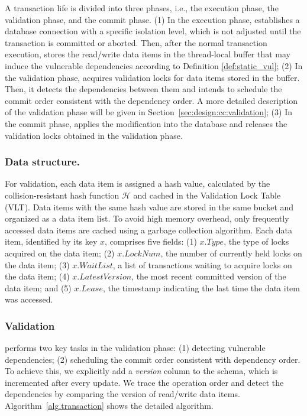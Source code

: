 A transaction life is divided into three phases, i.e., the execution phase, the validation phase, and the commit phase.
(1) In the execution phase, \sysname establishes a database connection with a specific isolation level, which is not adjusted until the transaction is committed or aborted. Then, after the normal transaction execution, \sysname stores the read/write data items in the thread-local buffer that may induce the vulnerable dependencies according to Definition \ref{def:static_vul};
(2) In the validation phase, \sysname acquires validation locks for data items stored in the buffer. Then, it detects the dependencies between them and intends to schedule the commit order consistent with the dependency order.
A more detailed description of the validation phase will be given in Section~\ref{sec:design:cc:validation}; 
(3) In the commit phase, \sysname applies the modification into the database and releases the validation locks obtained in the validation phase. 

{
\color{blue}
\subsubsection{Data structure.} 
For validation, each data item is assigned a hash value, calculated by the collision-resistant hash function $\mathcal{H}$ and cached in the Validation Lock Table (VLT). 
Data items with the same hash value are stored in the same bucket and organized as a data item list. 
To avoid high memory overhead, only frequently accessed data items are cached using a garbage collection algorithm. Each data item, identified by its key $x$, comprises five fields: (1) $x.Type$, the type of locks acquired on the data item; (2) $x.LockNum$, the number of currently held locks on the data item; (3) $x.WaitList$, a list of transactions waiting to acquire locks on the data item; (4) $x.LatestVersion$, the most recent committed version of the data item; and (5) $x.Lease$, the timestamp indicating the last time the data item was accessed. 
}

\subsubsection{Validation\label{sec:design:cc:validation}} \sysname performs two key tasks in the validation phase: (1) detecting vulnerable dependencies; (2) scheduling the commit order consistent with dependency order. To achieve this, we explicitly add a \textit{version} column to the schema, which is incremented after every update. We trace the operation order and detect the dependencies by comparing the version of read/write data items. 
 Algorithm~\ref{alg.transaction} shows the detailed algorithm. 


